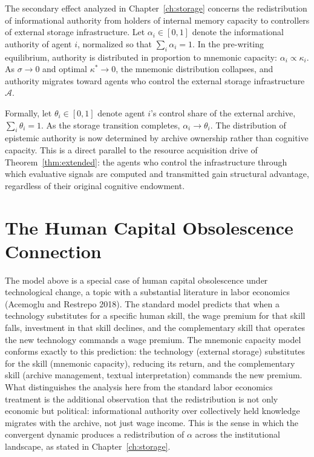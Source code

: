 \documentclass[12pt, oneside]{book}
\theoremstyle{plain}
\theoremstyle{definition}
\theoremstyle{remark}
\theoremstyle{definition}
\begin{document}
The secondary effect analyzed in Chapter~\ref{ch:storage} concerns the redistribution
of informational authority from holders of internal memory capacity to controllers
of external storage infrastructure. Let $\alpha_i \in [0,1]$ denote the informational
authority of agent $i$, normalized so that $\sum_i \alpha_i = 1$. In the pre-writing
equilibrium, authority is distributed in proportion to mnemonic capacity:
$\alpha_i \propto \kappa_i$. As $\sigma \to 0$ and optimal $\kappa^* \to 0$, the
mnemonic distribution collapses, and authority migrates toward agents who control
the external storage infrastructure $\mathcal{A}$.

Formally, let $\theta_i \in [0,1]$ denote agent $i$'s control share of the external
archive, $\sum_i \theta_i = 1$. As the storage transition completes,
$\alpha_i \to \theta_i$. The distribution of epistemic authority is now determined
by archive ownership rather than cognitive capacity. This is a direct parallel to
the resource acquisition drive of Theorem~\ref{thm:extended}: the agents who control
the infrastructure through which evaluative signals are computed and transmitted
gain structural advantage, regardless of their original cognitive endowment.

\section{The Human Capital Obsolescence Connection}

The model above is a special case of human capital obsolescence under technological
change, a topic with a substantial literature in labor economics (Acemoglu and Restrepo
2018). The standard model predicts that when a technology substitutes for a specific
human skill, the wage premium for that skill falls, investment in that skill declines,
and the complementary skill that operates the new technology commands a wage premium.
The mnemonic capacity model conforms exactly to this prediction: the technology
(external storage) substitutes for the skill (mnemonic capacity), reducing its return,
and the complementary skill (archive management, textual interpretation) commands the
new premium. What distinguishes the analysis here from the standard labor economics
treatment is the additional observation that the redistribution is not only economic
but political: informational authority over collectively held knowledge migrates with
the archive, not just wage income. This is the sense in which the convergent dynamic
produces a redistribution of $\alpha$ across the institutional landscape, as stated
in Chapter~\ref{ch:storage}.
\end{document}
